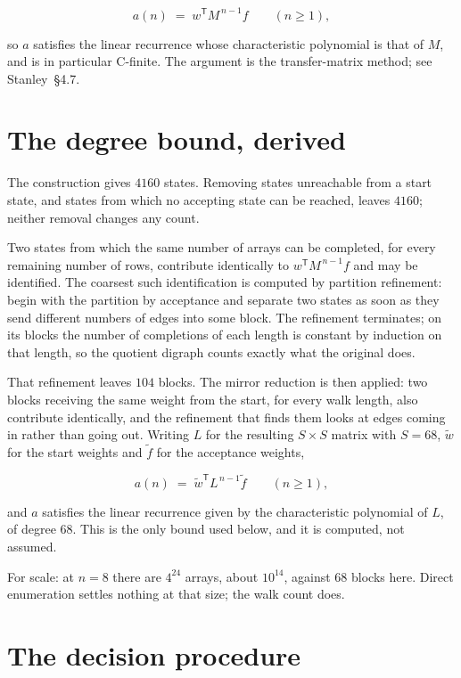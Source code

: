 \documentclass[11pt]{article}
\theoremstyle{definition}
\begin{document}
\[a(n) \;=\; w^{\mathsf T} M^{\,n-1} f \qquad (n \ge 1),\]

so $a$ satisfies the linear recurrence whose characteristic polynomial is that of $M$, and is in particular C-finite. The argument is the transfer-matrix method; see Stanley~\S4.7.

\section{The degree bound, derived}

The construction gives $4160$ states. Removing states unreachable from a start state, and states from which no accepting state can be reached, leaves $4160$; neither removal changes any count.

Two states from which the same number of arrays can be completed, for every remaining number of rows, contribute identically to $w^{\mathsf T}M^{\,n-1}f$ and may be identified. The coarsest such identification is computed by partition refinement: begin with the partition by acceptance and separate two states as soon as they send different numbers of edges into some block. The refinement terminates; on its blocks the number of completions of each length is constant by induction on that length, so the quotient digraph counts exactly what the original does.

That refinement leaves $104$ blocks. The mirror reduction is then applied: two blocks receiving the same weight from the start, for every walk length, also contribute identically, and the refinement that finds them looks at edges coming in rather than going out. Writing $L$ for the resulting $S \times S$ matrix with $S = 68$, $\tilde w$ for the start weights and $\tilde f$ for the acceptance weights,

\[a(n) \;=\; \tilde w^{\mathsf T} L^{\,n-1} \tilde f \qquad (n \ge 1),\]

and $a$ satisfies the linear recurrence given by the characteristic polynomial of $L$, of degree $68$. This is the only bound used below, and it is computed, not assumed.

For scale: at $n = 8$ there are $4^{24}$ arrays, about $10^{14}$, against $68$ blocks here. Direct enumeration settles nothing at that size; the walk count does.

\section{The decision procedure}
\end{document}
